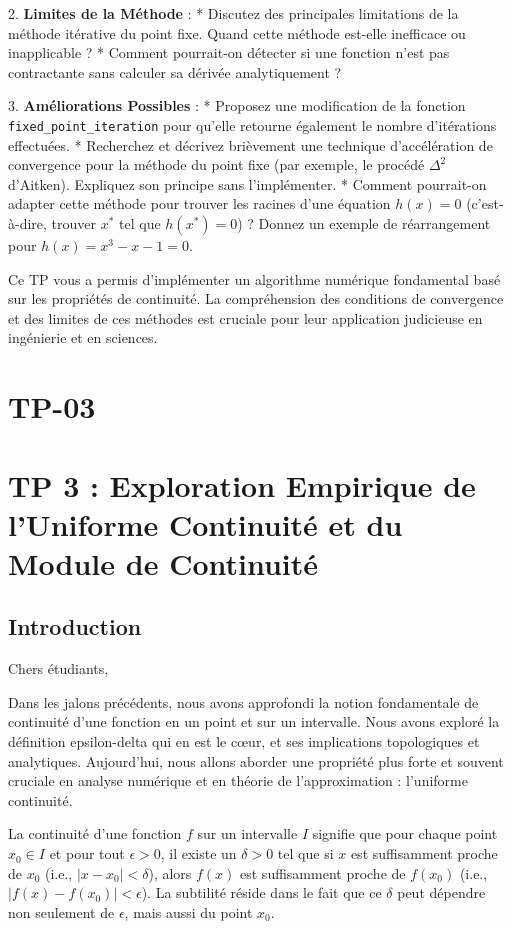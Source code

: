 \documentclass[12pt,a4paper]{report}
\begin{document}
2.  \textbf{Limites de la Méthode} :
    *   Discutez des principales limitations de la méthode itérative du point fixe. Quand cette méthode est-elle inefficace ou inapplicable ?
    *   Comment pourrait-on détecter si une fonction n'est pas contractante sans calculer sa dérivée analytiquement ?

3.  \textbf{Améliorations Possibles} :
    *   Proposez une modification de la fonction \texttt{fixed\_point\_iteration} pour qu'elle retourne également le nombre d'itérations effectuées.
    *   Recherchez et décrivez brièvement une technique d'accélération de convergence pour la méthode du point fixe (par exemple, le procédé $\Delta^2$ d'Aitken). Expliquez son principe sans l'implémenter.
    *   Comment pourrait-on adapter cette méthode pour trouver les racines d'une équation $h(x) = 0$ (c'est-à-dire, trouver $x^*$ tel que $h(x^*) = 0$) ? Donnez un exemple de réarrangement pour $h(x) = x^3 - x - 1 = 0$.

Ce TP vous a permis d'implémenter un algorithme numérique fondamental basé sur les propriétés de continuité. La compréhension des conditions de convergence et des limites de ces méthodes est cruciale pour leur application judicieuse en ingénierie et en sciences.

\section{TP-03}
\section{TP 3 : Exploration Empirique de l'Uniforme Continuité et du Module de Continuité}

\subsection{Introduction}

Chers étudiants,

Dans les jalons précédents, nous avons approfondi la notion fondamentale de continuité d'une fonction en un point et sur un intervalle. Nous avons exploré la définition epsilon-delta qui en est le cœur, et ses implications topologiques et analytiques. Aujourd'hui, nous allons aborder une propriété plus forte et souvent cruciale en analyse numérique et en théorie de l'approximation : l'uniforme continuité.

La continuité d'une fonction $f$ sur un intervalle $I$ signifie que pour chaque point $x_0 \in I$ et pour tout $\epsilon > 0$, il existe un $\delta > 0$ tel que si $x$ est suffisamment proche de $x_0$ (i.e., $|x - x_0| < \delta$), alors $f(x)$ est suffisamment proche de $f(x_0)$ (i.e., $|f(x) - f(x_0)| < \epsilon$). La subtilité réside dans le fait que ce $\delta$ peut dépendre non seulement de $\epsilon$, mais aussi du point $x_0$.
\end{document}
